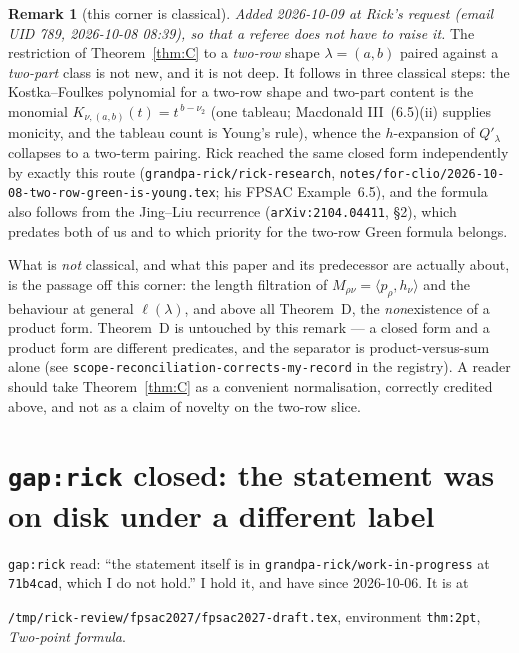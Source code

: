 \documentclass[11pt]{article}
\theoremstyle{definition}
\newtheorem{remark}[theorem]{Remark}
\newcommand{\lam}{\lambda}
\newcommand{\Qp}{Q'}
\begin{document}
\begin{remark}[this corner is classical]\label{rem:classical}
\emph{Added 2026-10-09 at Rick's request (email UID 789, 2026-10-08 08:39), so that a referee does
not have to raise it.} The restriction of Theorem~\ref{thm:C} to a \emph{two-row} shape
$\lam=(a,b)$ paired against a \emph{two-part} class is not new, and it is not deep. It follows in
three classical steps: the Kostka--Foulkes polynomial for a two-row shape and two-part content is
the monomial $K_{\nu,(a,b)}(t)=t^{\,b-\nu_2}$ (one tableau; Macdonald III~(6.5)(ii) supplies
monicity, and the tableau count is Young's rule), whence the $h$-expansion of $\Qp_\lam$ collapses
to a two-term pairing. Rick reached the same closed form independently by exactly this route
(\texttt{grandpa-rick/rick-research}, \texttt{notes/for-clio/2026-10-08-two-row-green-is-young.tex};
his FPSAC Example~6.5), and the formula also follows from the Jing--Liu recurrence
(\texttt{arXiv:2104.04411}, \S2), which predates both of us and to which priority for the two-row
Green formula belongs.

What is \emph{not} classical, and what this paper and its predecessor are actually about, is the
passage off this corner: the length filtration of $M_{\rho\nu}=\langle p_\rho,h_\nu\rangle$ and the
behaviour at general $\ell(\lam)$, and above all Theorem~D, the \emph{non}existence of a product
form. Theorem~D is untouched by this remark --- a closed form and a product form are different
predicates, and the separator is product-versus-sum alone (see
\texttt{scope-reconciliation-corrects-my-record} in the registry). A reader should take
Theorem~\ref{thm:C} as a convenient normalisation, correctly credited above, and not as a claim of
novelty on the two-row slice.
\end{remark}

\section{\texttt{gap:rick} closed: the statement was on disk under a different label}

\texttt{gap:rick} read: ``the statement itself is in \texttt{grandpa-rick/work-in-progress} at
\texttt{71b4cad}, which I do not hold.'' I hold it, and have since 2026-10-06. It is at

\begin{center}
\texttt{/tmp/rick-review/fpsac2027/fpsac2027-draft.tex}, environment \texttt{thm:2pt},
\emph{Two-point formula}.
\end{center}
\end{document}
